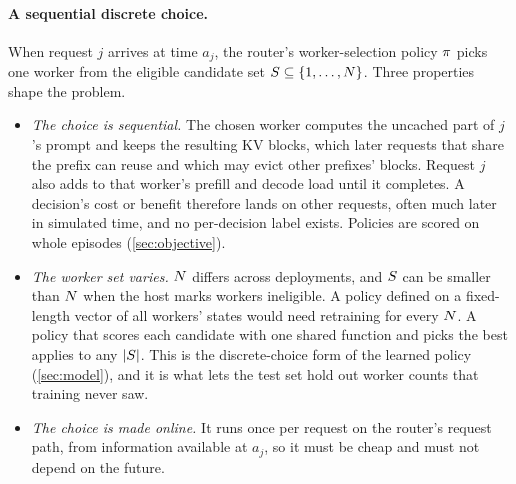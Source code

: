 \paragraph{A sequential discrete choice.}
When request $j$ arrives at time $a_j$, the router's worker-selection policy $\pi$ picks one
worker from the eligible candidate set $S \subseteq \{1,\dots,N\}$. Three properties shape
the problem.
\begin{itemize}
  \item \emph{The choice is sequential.} The chosen worker computes the uncached part of $j$'s
    prompt and keeps the resulting KV blocks, which later requests that share the prefix can reuse
    and which may evict other prefixes' blocks. Request $j$ also adds to that worker's prefill and
    decode load until it completes. A decision's cost or benefit therefore lands on other requests,
    often much later in simulated time, and no per-decision label exists. Policies are scored on
    whole episodes (\cref{sec:objective}).
  \item \emph{The worker set varies.} $N$ differs across deployments, and $S$ can be smaller
    than $N$ when the host marks workers ineligible. A policy defined on a fixed-length vector of
    all workers' states would need retraining for every $N$. A policy that scores each candidate
    with one shared function and picks the best applies to any $|S|$. This is the
    discrete-choice form of the learned policy (\cref{sec:model}), and it is what lets the test
    set hold out worker counts that training never saw.
  \item \emph{The choice is made online.} It runs once per request on the router's request path,
    from information available at $a_j$, so it must be cheap and must not depend on the future.
\end{itemize}

